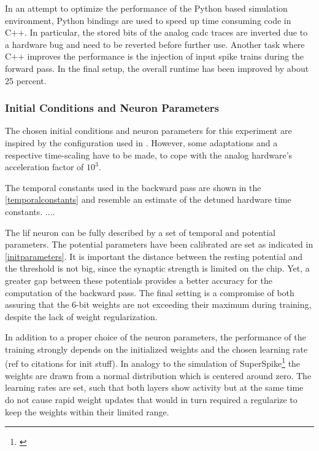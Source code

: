 In an attempt to optimize the performance of the Python based simulation environment, Python bindings are used to speed up time consuming code in C++. In particular, the stored bits of the analog \gls{cadc} traces are inverted due to a hardware bug and need to be reverted before further use. Another task where C++ improves the performance is the injection of input spike trains during the forward pass. In the final setup, the overall runtime has been improved by about 25 percent. 

\subsubsection*{Initial Conditions and Neuron Parameters}

The chosen initial conditions and neuron parameters for this experiment are inspired by the configuration used in \citealp{zenke2018superspike}. However, some adaptations and a respective time-scaling have to be made, to cope with the analog hardware's acceleration factor of $10^3$. 

The temporal constants used in the backward pass are shown in the \cref{temporalconstants} and resemble an estimate of the detuned hardware time constants. .... 


The \gls{lif} neuron can be fully described by a set of temporal and potential parameters. The potential parameters have been calibrated are set as indicated in \cref{initparameters}. It is important the distance between the resting potential and the threshold is not big, since the synaptic strength is limited on the chip. Yet, a greater gap between these potentials provides a better accuracy for the computation of the backward pass. The final setting is a compromise of both assuring that the 6-bit weights are not exceeding their maximum during training, despite the lack of weight regularization.

In addition to a proper choice of the neuron parameters, the performance of the training strongly depends on the initialized weights and the chosen learning rate (ref to citations for init stuff). In analogy to the simulation of SuperSpike\footnote{\label{fnote}\citealp{zenke2018superspike}} the weights are drawn from a normal distribution which is centered around zero. The learning rates are set, such that both layers show activity but at the same time do not cause rapid weight updates that would in turn required a regularize to keep the weights within their limited range.

